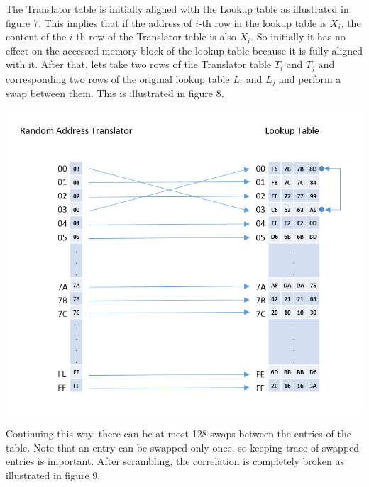 The Translator table is initially aligned with the Lookup table as illustrated in figure 7. This implies that if the address of $i$-th row in the lookup table is $X_i$, the content of the $i$-th row of the Translator table is also $X_i$. So initially it has no effect on the accessed memory block of the lookup table because it is fully aligned with it. After that, lets take two rows of the Translator table $T_i$ and $T_j$ and corresponding two rows of the original lookup table $L_i$ and $L_j$ and perform a swap between them. This is illustrated in figure 8.

\begin{center}
\includegraphics[scale=0.38,natwidth=785,natheight=666]{Figures/rat-step-1.png}
\label{fig: Random Address Translator after first swap.}
\end{center}

Continuing this way, there can be at most 128 swaps between the entries of the table. Note that an entry can be swapped only once, so keeping trace of swapped entries is important. After scrambling, the correlation is completely broken as illustrated in figure 9.

